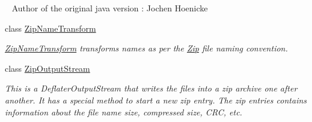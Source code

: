 \begin{DoxyCompactItemize}
\begin{DoxyCompactList}
 ~\newline
Author of the original java version \+: Jochen Hoenicke \end{DoxyCompactList}\item 
class \hyperlink{class_i_c_sharp_code_1_1_sharp_zip_lib_1_1_zip_1_1_zip_name_transform}{Zip\+Name\+Transform}
\begin{DoxyCompactList}\small\item\em \hyperlink{class_i_c_sharp_code_1_1_sharp_zip_lib_1_1_zip_1_1_zip_name_transform}{Zip\+Name\+Transform} transforms names as per the \hyperlink{namespace_i_c_sharp_code_1_1_sharp_zip_lib_1_1_zip}{Zip} file naming convention. \end{DoxyCompactList}\item 
class \hyperlink{class_i_c_sharp_code_1_1_sharp_zip_lib_1_1_zip_1_1_zip_output_stream}{Zip\+Output\+Stream}
\begin{DoxyCompactList}\small\item\em This is a Deflater\+Output\+Stream that writes the files into a zip archive one after another. It has a special method to start a new zip entry. The zip entries contains information about the file name size, compressed size, C\+RC, etc. \end{DoxyCompactList}\end{DoxyCompactItemize}
